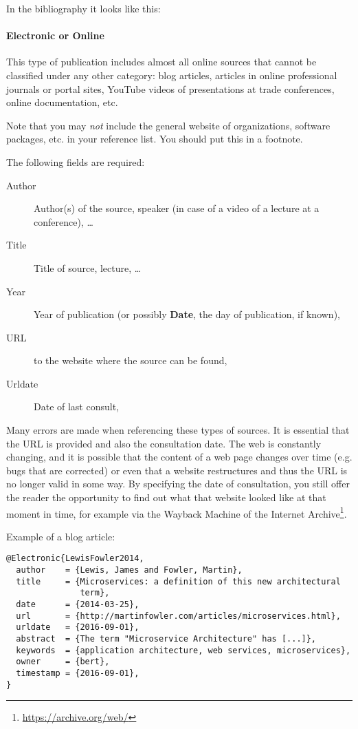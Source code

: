 In the bibliography it looks like this: 


\paragraph{Electronic or Online}

This type of publication includes almost all online sources that cannot be classified under any other category: blog articles, articles in online professional journals or portal sites, YouTube videos of presentations at trade conferences, online documentation, etc.

Note that you may \emph{not} include the general website of organizations, software packages, etc. in your reference list. You should put this in a footnote.

The following fields are required:

\begin{description}
  \item[Author] Author(s) of the source, speaker (in case of a video of a lecture at a conference), \ldots
  \item[Title] Title of source, lecture, \ldots
  \item[Year] Year of publication (or possibly \textbf{Date}, the day of publication, if known),
  \item[URL] to the website where the source can be found,
  \item[Urldate] Date of last consult,
\end{description}

Many errors are made when referencing these types of sources. It is essential that the URL is provided and also the consultation date. The web is constantly changing, and it is possible that the content of a web page changes over time (e.g. bugs that are corrected) or even that a website restructures and thus the URL is no longer valid in some way. By specifying the date of consultation, you still offer the reader the opportunity to find out what that website looked like at that moment in time, for example via the Wayback Machine of the Internet Archive\footnote{\url{https://archive.org/web/}}.

Example of a blog article:

\begin{verbatim}
@Electronic{LewisFowler2014,
  author    = {Lewis, James and Fowler, Martin},
  title     = {Microservices: a definition of this new architectural
               term},
  date      = {2014-03-25},
  url       = {http://martinfowler.com/articles/microservices.html},
  urldate   = {2016-09-01},
  abstract  = {The term "Microservice Architecture" has [...]},
  keywords  = {application architecture, web services, microservices},
  owner     = {bert},
  timestamp = {2016-09-01},
}
\end{verbatim}

